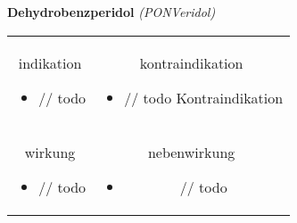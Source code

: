 \begin{frame}{
    \textbf{Dehydrobenzperidol}
    \textit{(PONVeridol)}
}
    \begin{tabular}{c c}
        \begin{beamercolorbox}[wd=\boxwidth\textwidth,ht=\boxheight\textheight,sep=1em]{indikation}
            \begin{itemize}
                \item // todo
            \end{itemize}
        \end{beamercolorbox} & 
        \begin{beamercolorbox}[wd=\boxwidth\textwidth,ht=\boxheight\textheight,sep=1em]{kontraindikation}
            \begin{itemize}
                \item // todo Kontraindikation 
            \end{itemize}
        \end{beamercolorbox} \\
        \begin{beamercolorbox}[wd=\boxwidth\textwidth,ht=\boxheight\textheight,sep=1em]{wirkung}
            \begin{itemize}
                \item // todo
            \end{itemize}
        \end{beamercolorbox} & 
        \begin{beamercolorbox}[wd=\boxwidth\textwidth,ht=\boxheight\textheight,sep=1em]{nebenwirkung}
            \begin{itemize}
                \item // todo
            \end{itemize}
        \end{beamercolorbox} \\
    \end{tabular}
\end{frame}

